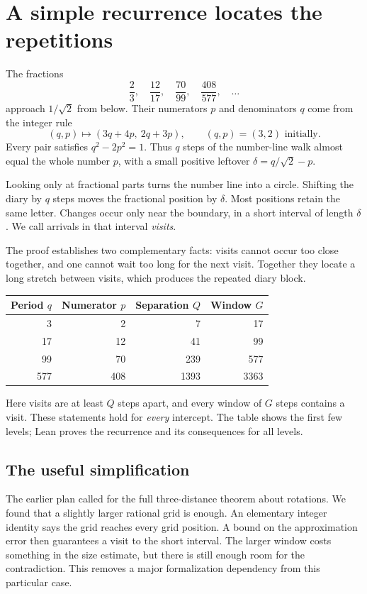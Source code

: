 \documentclass[11pt]{article}
\begin{document}
\newpage
\section{A simple recurrence locates the repetitions}
The fractions
\[
\frac23,\quad\frac{12}{17},\quad\frac{70}{99},\quad
\frac{408}{577},\quad\ldots
\]
approach $1/\sqrt2$ from below. Their numerators $p$ and denominators $q$
come from the integer rule
\[
(q,p)\longmapsto(3q+4p,\ 2q+3p),\qquad(q,p)=(3,2)\text{ initially}.
\]
Every pair satisfies $q^2-2p^2=1$. Thus $q$ steps of the number-line walk
almost equal the whole number $p$, with a small positive leftover
$\delta=q/\sqrt2-p$.

Looking only at fractional parts turns the number line into a circle.
Shifting the diary by $q$ steps moves the fractional position by
$\delta$. Most positions retain the same letter. Changes occur only
near the boundary, in a short interval of length $\delta$. We call
arrivals in that interval \emph{visits}.

The proof establishes two complementary facts: visits cannot occur too
close together, and one cannot wait too long for the next visit.
Together they locate a long stretch between visits, which produces the
repeated diary block.

\begin{center}
\begin{tabular}{rrrr}
\toprule
Period $q$ & Numerator $p$ & Separation $Q$ & Window $G$\\
\midrule
3 & 2 & 7 & 17\\
17 & 12 & 41 & 99\\
99 & 70 & 239 & 577\\
577 & 408 & 1393 & 3363\\
\bottomrule
\end{tabular}
\end{center}
Here visits are at least $Q$ steps apart, and every window of $G$ steps
contains a visit. These statements hold for \emph{every} intercept.
The table shows the first few levels; Lean proves the recurrence and
its consequences for all levels.

\subsection*{The useful simplification}
The earlier plan called for the full three-distance theorem about
rotations. We found that a slightly larger rational grid is enough.
An elementary integer identity says the grid reaches every grid position.
A bound on the approximation error then guarantees a visit to the short
interval. The larger window costs something in the size estimate, but
there is still enough room for the contradiction. This removes a major
formalization dependency from this particular case.
\end{document}
